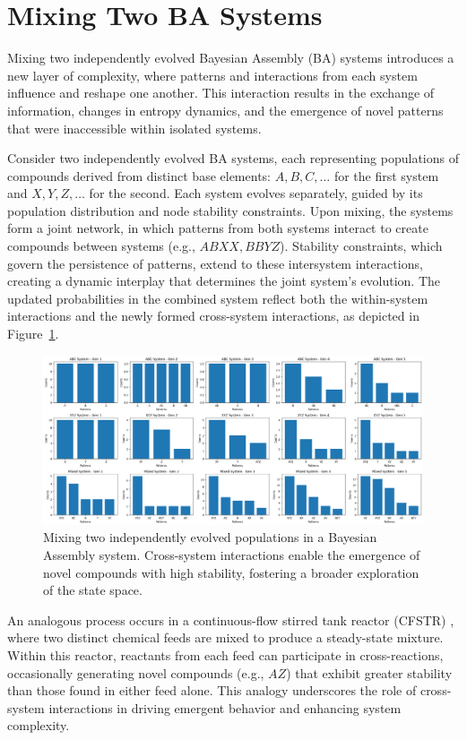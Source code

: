 \documentclass[entropy,article,submit,pdftex,moreauthors]{Definitions/mdpi}
\begin{document}
\section{Mixing Two BA Systems}

Mixing two independently evolved Bayesian Assembly (BA) systems introduces a new layer of complexity, where patterns and interactions from each system influence and reshape one another. This interaction results in the exchange of information, changes in entropy dynamics, and the emergence of novel patterns that were inaccessible within isolated systems.

Consider two independently evolved BA systems, each representing populations of compounds derived from distinct base elements: \( A, B, C, \dots \) for the first system and \( X, Y, Z, \dots \) for the second. Each system evolves separately, guided by its population distribution and node stability constraints. Upon mixing, the systems form a joint network, in which patterns from both systems interact to create compounds between systems (e.g., \( ABXX, BBYZ \)). Stability constraints, which govern the persistence of patterns, extend to these intersystem interactions, creating a dynamic interplay that determines the joint system's evolution. The updated probabilities in the combined system reflect both the within-system interactions and the newly formed cross-system interactions, as depicted in Figure~\ref{fig:mixed_1}.

\begin{figure}[htp]
    \centering
    \includegraphics[width=13cm]{mixed_1}
    \caption{Mixing two independently evolved populations in a Bayesian Assembly system. Cross-system interactions enable the emergence of novel compounds with high stability, fostering a broader exploration of the state space.}
    \label{fig:mixed_1}
\end{figure}

An analogous process occurs in a continuous-flow stirred tank reactor (CFSTR) \cite{fogler1999chemical}, where two distinct chemical feeds are mixed to produce a steady-state mixture. Within this reactor, reactants from each feed can participate in cross-reactions, occasionally generating novel compounds (e.g., \( AZ \)) that exhibit greater stability than those found in either feed alone. This analogy underscores the role of cross-system interactions in driving emergent behavior and enhancing system complexity.
\end{document}

